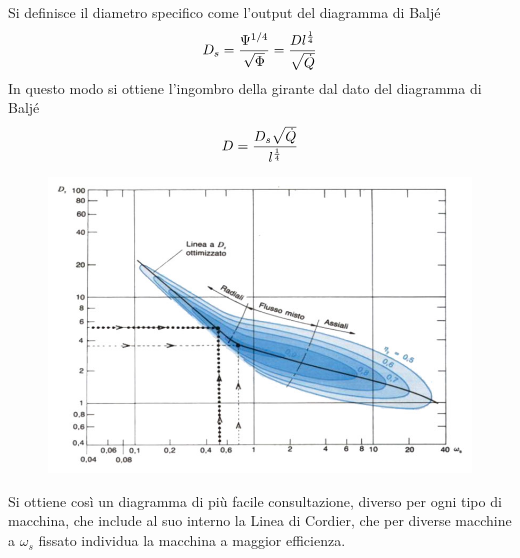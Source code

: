 \documentclass[a4paper, 15pt]{article}
\begin{document}
\begin{adjustwidth}{2in}{}
Si definisce il diametro specifico come l'output del diagramma di Baljé 
\[D_s = \dfrac{\Psi^{1/4}}{\sqrt{\Phi}} = \dfrac{Dl^{1\over4}}{\sqrt{\dot{Q}}}\]
In questo modo si ottiene l'ingombro della girante dal dato del diagramma di Baljé
\[D = \dfrac{D_s\sqrt{\dot{Q}}}{l^{1\over4}}\]
\begin{figure}[H]
\centering
\includegraphics[width=0.7\linewidth]{immagini/diagrammabalie}
\label{fig:diagramma-balie}
\end{figure}
Si ottiene così un diagramma di più facile consultazione, diverso per ogni tipo di macchina, che include al suo interno la Linea di Cordier, che per diverse macchine a $\omega_s$ fissato individua la macchina a maggior efficienza.
\end{adjustwidth}



\newpage
\end{document}
